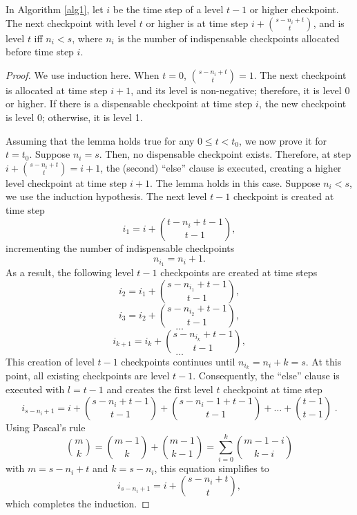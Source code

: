 \documentclass[oneeqnum, onethmnum, onefignum, onetabnum]{siamltex}
\begin{document}
\begin{lemma} \label{lem0}
    In Algorithm \ref{alg1}, let $i$ be the time step of a level $t - 1$ or
    higher checkpoint.  The next checkpoint with level $t$ or higher is at
    time step $i + \binom{s - n_i + t}{t}$, and is level
    $t$ iff $n_i < s$,
    where $n_i$ is the number of indispensable checkpoints allocated
    before time step $i$.
\end{lemma}
\begin{proof}
    We use induction here.  When $t = 0$, 
    $\binom{s - n_i + t}{t} = 1$.  The next checkpoint is allocated
    at time step $i + 1$, and its level is non-negative; therefore, it is
    level 0 or higher.  If there is a dispensable checkpoint at time step $i$,
    the new checkpoint is level 0; otherwise, it is level 1.

    Assuming that the lemma holds true for any $0 \le t < t_0$,
    we now prove it for $t = t_0$.  Suppose $n_i = s$.  Then, no
    dispensable checkpoint exists.  Therefore, at step
    $i + \binom{s - n_i + t}{t} = i + 1$, the (second) ``else'' clause is
    executed, creating a higher level checkpoint at time step $i + 1$.
    The lemma holds in this case.
    Suppose $n_i < s$, we use the induction hypothesis.
    The next level $t - 1$ checkpoint is created at time step 
    $$i_1 = i + \binom{t - n_i + t - 1}{t - 1},$$
    incrementing the number of indispensable checkpoints
    $$n_{i_1} = n_i + 1.$$
    As a result, the following level $t - 1$ checkpoints are created at time
    steps
    $$i_2 = i_1 + \binom{s - n_{i_1} + t - 1}{t - 1},$$
    $$i_3 = i_2 + \binom{s - n_{i_2} + t - 1}{t - 1},$$
    $$\ldots$$
    $$i_{k + 1} = i_k + \binom{s - n_{i_k} + t - 1}{t - 1},$$
    $$\ldots$$
    This creation of level $t - 1$ checkpoints continues until
    $n_{i_k} = n_i + k = s$.  At this point, all existing checkpoints
    are level $t - 1$.  Consequently, the ``else'' clause is executed with
    $l = t - 1$ and creates the first level $t$ checkpoint at time step
    \[ i_{s - n_i + 1} = i + \binom{s - n_i + t - 1}{t - 1}
        + \binom{s - n_i - 1 + t - 1}{t - 1} + \ldots
        + \binom{t - 1}{t - 1} \;.\]
    Using Pascal's rule
    $$\binom{m}{k} = \binom{m - 1}{k} + \binom{m - 1}{k - 1}
       = \sum_{i = 0}^k \binom{m - 1 - i}{k - i}$$
    with $m = s - n_i + t$ and $k = s - n_i$, this equation
    simplifies to
    \[ i_{s - n_i + 1} = i + \binom{s - n_i + t}{t}, \]
    which completes the induction.
\end{proof}
\end{document}
